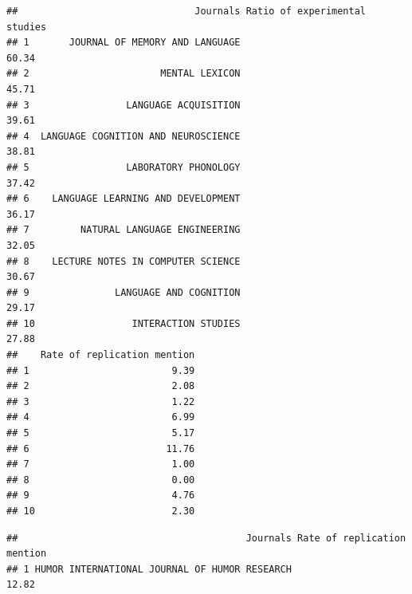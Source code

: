 \documentclass[]{elsarticle} %
\begin{document}
\begin{verbatim}
##                               Journals Ratio of experimental studies
## 1       JOURNAL OF MEMORY AND LANGUAGE                         60.34
## 2                       MENTAL LEXICON                         45.71
## 3                 LANGUAGE ACQUISITION                         39.61
## 4  LANGUAGE COGNITION AND NEUROSCIENCE                         38.81
## 5                 LABORATORY PHONOLOGY                         37.42
## 6    LANGUAGE LEARNING AND DEVELOPMENT                         36.17
## 7         NATURAL LANGUAGE ENGINEERING                         32.05
## 8    LECTURE NOTES IN COMPUTER SCIENCE                         30.67
## 9               LANGUAGE AND COGNITION                         29.17
## 10                 INTERACTION STUDIES                         27.88
##    Rate of replication mention
## 1                         9.39
## 2                         2.08
## 3                         1.22
## 4                         6.99
## 5                         5.17
## 6                        11.76
## 7                         1.00
## 8                         0.00
## 9                         4.76
## 10                        2.30
\end{verbatim}

\begin{verbatim}
##                                        Journals Rate of replication mention
## 1 HUMOR INTERNATIONAL JOURNAL OF HUMOR RESEARCH                       12.82
\end{verbatim}
\end{document}
